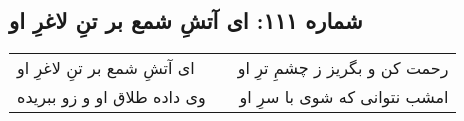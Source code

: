 \begin{center}
\section*{شماره ۱۱۱: ای آتشِ شمع بر تنِ لاغرِ او}
\label{sec:111}
\begin{longtable}{l p{0.5cm} r}
ای آتشِ شمع بر تنِ لاغرِ او
&&
رحمت کن و بگریز ز چشمِ ترِ او
\\
وی داده طلاق او و زو ببریده
&&
امشب نتوانی که شوی با سرِ او
\\
\end{longtable}
\end{center}
